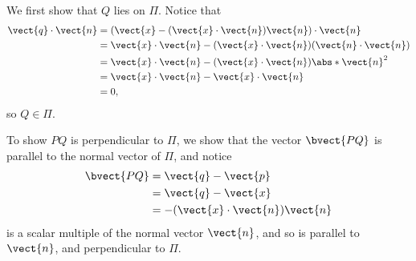 \Question{\currfilebase}

We first show that \(Q\) lies on \(\Pi\). Notice that
\begin{align*}
    \vect{q} \cdot \vect{n} & = \left(\vect{x} - (\vect{x} \cdot \vect{n}) \vect{n}\right) \cdot \vect{n}     \\
                            & = \vect{x} \cdot \vect{n} - (\vect{x} \cdot \vect{n}) (\vect{n} \cdot \vect{n}) \\
                            & = \vect{x} \cdot \vect{n} - (\vect{x} \cdot \vect{n}) \abs*{\vect{n}}^2         \\
                            & = \vect{x} \cdot \vect{n} - \vect{x} \cdot \vect{n}                             \\
                            & = 0,
\end{align*}
so \(Q \in \Pi\).

To show \(PQ\) is perpendicular to \(\Pi\), we show that the vector \(\bvect{PQ}\) is parallel to the normal vector of \(\Pi\), and notice
\begin{align*}
    \bvect{PQ} & = \vect{q} - \vect{p}                  \\
               & = \vect{q} - \vect{x}                  \\
               & = - (\vect{x} \cdot \vect{n}) \vect{n}
\end{align*}
is a scalar multiple of the normal vector \(\vect{n}\), and so is parallel to \(\vect{n}\), and perpendicular to \(\Pi\).


